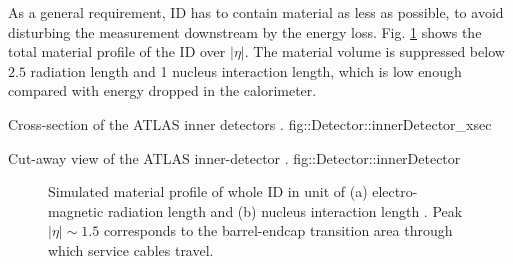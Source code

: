 
%
As a general requirement, ID has to contain material as less as possible, to avoid disturbing the measurement downstream by the energy loss. 
Fig. \ref{fig::Detector::IDmaterial} shows the total material profile of the ID over $|\eta|$. 
The material volume is suppressed below $2.5$ radiation length and 1 nucleus interaction length, which is low enough compared with energy dropped in the calorimeter.


{Cross-section of the ATLAS inner detectors \cite{ATLAS_exp}.}
{fig::Detector::innerDetector_xsec}


{Cut-away view of the ATLAS inner-detector \cite{ATLAS_exp}.}
{fig::Detector::innerDetector}

\begin{figure}[h]
  \centering
    \caption{ Simulated material profile of whole ID in unit of (a) electro-magnetic radiation length and (b) nucleus interaction length \cite{ATLAS_exp}.
      Peak $|\eta|\sim 1.5$ corresponds to the barrel-endcap transition area through which service cables travel.
      \label{fig::Detector::IDmaterial} }
\end{figure}



